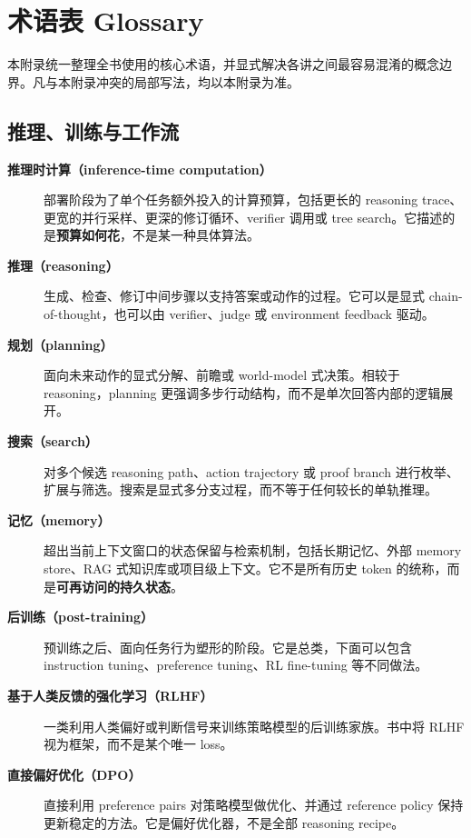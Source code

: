 \chapter{术语表 Glossary}

本附录统一整理全书使用的核心术语，并显式解决各讲之间最容易混淆的概念边界。凡与本附录冲突的局部写法，均以本附录为准。

\section{推理、训练与工作流}

\begin{description}
\item[\textbf{推理时计算（inference-time computation）}] 部署阶段为了单个任务额外投入的计算预算，包括更长的 reasoning trace、更宽的并行采样、更深的修订循环、verifier 调用或 tree search。它描述的是\textbf{预算如何花}，不是某一种具体算法。

\item[\textbf{推理（reasoning）}] 生成、检查、修订中间步骤以支持答案或动作的过程。它可以是显式 chain-of-thought，也可以由 verifier、judge 或 environment feedback 驱动。

\item[\textbf{规划（planning）}] 面向未来动作的显式分解、前瞻或 world-model 式决策。相较于 reasoning，planning 更强调多步行动结构，而不是单次回答内部的逻辑展开。

\item[\textbf{搜索（search）}] 对多个候选 reasoning path、action trajectory 或 proof branch 进行枚举、扩展与筛选。搜索是显式多分支过程，而不等于任何较长的单轨推理。

\item[\textbf{记忆（memory）}] 超出当前上下文窗口的状态保留与检索机制，包括长期记忆、外部 memory store、RAG 式知识库或项目级上下文。它不是所有历史 token 的统称，而是\textbf{可再访问的持久状态}。

\item[\textbf{后训练（post-training）}] 预训练之后、面向任务行为塑形的阶段。它是总类，下面可以包含 instruction tuning、preference tuning、RL fine-tuning 等不同做法。

\item[\textbf{基于人类反馈的强化学习（RLHF）}] 一类利用人类偏好或判断信号来训练策略模型的后训练家族。书中将 RLHF 视为框架，而不是某个唯一 loss。

\item[\textbf{直接偏好优化（DPO）}] 直接利用 preference pairs 对策略模型做优化、并通过 reference policy 保持更新稳定的方法。它是偏好优化器，不是全部 reasoning recipe。


\end{description}
